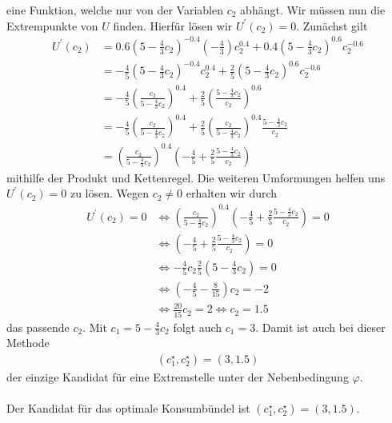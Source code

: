 eine Funktion, welche nur von der Variablen $c_2$ abhängt.
Wir müssen nun die Extrempunkte von $U$ finden. 
Hierfür lösen wir $U^\prime(c_2) = 0 $.
Zunächst gilt
\begin{equation*}
\begin{split}
U^\prime(c_2)
&= 0.6 \left( 5 - \frac{4}{3} c_2 \right)^{-0.4} \left( -\frac{4}{3} \right) c_2^{0.4}
+ 0.4 \left( 5 - \frac{4}{3} c_2 \right)^{0.6} c_2^{-0.6}\\
&= -\frac{4}{5} \left( 5 - \frac{4}{3} c_2 \right)^{-0.4}  c_2^{0.4}
+ \frac{2}{5} \left( 5 - \frac{4}{3} c_2 \right)^{0.6} c_2^{-0.6}\\
&= - \frac{4}{5} \left( \frac{c_2}{5 - \frac{4}{3} c_2} \right)^{0.4}
+ \frac{2}{5} \left( \frac{5 - \frac{4}{3} c_2}{c_2}  \right)^{0.6}\\
&= - \frac{4}{5} \left( \frac{c_2}{5 - \frac{4}{3} c_2} \right)^{0.4}
+ \frac{2}{5} \left( \frac{c_2}{5 - \frac{4}{3} c_2} \right)^{0.4} \frac{5 - \frac{4}{3} c_2}{c_2}\\
&=
\left( \frac{c_2}{5 - \frac{4}{3} c_2} \right)^{0.4} \left( -\frac{4}{5} + \frac{2}{5} \frac{5 - \frac{4}{3} c_2}{c_2} \right)
\end{split}
\end{equation*}
mithilfe der Produkt und Kettenregel.
Die weiteren Umformungen helfen uns $U^\prime(c_2) = 0$ zu lösen.
Wegen $c_2 \neq 0 $ erhalten wir durch
\begin{equation*}
\begin{split}
U^\prime(c_2) = 0 
&\Leftrightarrow
\left( \frac{c_2}{5 - \frac{4}{3} c_2} \right)^{0.4} \left( -\frac{4}{5} + \frac{2}{5} \frac{5 - \frac{4}{3} c_2}{c_2} \right) = 0\\
&\Leftrightarrow
\left( -\frac{4}{5} + \frac{2}{5} \frac{5 - \frac{4}{3} c_2}{c_2} \right) = 0\\
&\Leftrightarrow
-\frac{4}{5} c_2 \frac{2}{5}\left(5 -\frac{4}{3} c_2 \right) = 0 \\
&\Leftrightarrow
\left(- \frac{4}{5} - \frac{8}{15} \right) c_2 = -2\\
&\Leftrightarrow
\frac{20}{15} c_2 =  2 
\Leftrightarrow
c_2 = 1.5
\end{split}
\end{equation*}
das passende $c_2$.
Mit $c_1 = 5 - \frac{4}{3} c_2$ folgt auch $c_1 = 3$.
Damit ist auch bei dieser Methode
\begin{align*}
(c_1^\star , c_2^\star) = (3, 1.5)
\end{align*}
der einzige Kandidat für eine Extremstelle unter der Nebenbedingung $\varphi$.
\\
\\
Der Kandidat für das optimale Konsumbündel ist $(c_1^\star , c_2^\star) = (3, 1.5)$.

